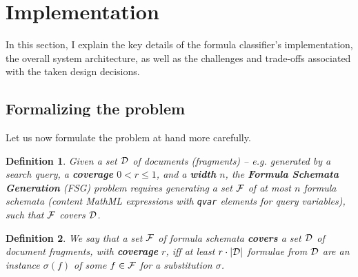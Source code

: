 \documentclass[a4paper,11pt,oneside]{article}
\newtheorem{definition}{Definition}
\begin{document}
\section{Implementation}\label{sec:implementation}

In this section, I explain the key details of the formula classifier's
implementation, the overall system architecture, as well as the challenges and
trade-offs associated with the taken design decisions.

\subsection{Formalizing the problem}\label{subsec:formal_problem}
Let us now formulate the problem at hand more carefully.

\begin{definition}
  Given a set $\mathcal{D}$ of documents (fragments) -- e.g. generated by a search
  query, a \textbf{coverage} $0<r\leq1$, and a \textbf{width} $n$, the
  \textbf{Formula Schemata Generation} (FSG) problem requires generating
  a set $\mathcal{F}$ of at most $n$ formula schemata (content MathML expressions with
  \lstinline|qvar| elements for query variables), such that $\mathcal{F}$ covers $\mathcal{D}$.
\end{definition}


\begin{definition}
  We say that a set $\mathcal{F}$ of formula schemata \textbf{covers} a set $\mathcal{D}$ of
  document fragments, with \textbf{coverage} $r$, iff at least $r \cdot |\mathcal{D}|$
  formulae from $\mathcal{D}$ are an instance $\sigma(f)$ of some $f\in\mathcal{F}$ for a
  substitution $\sigma$.
\end{definition}
\end{document}
